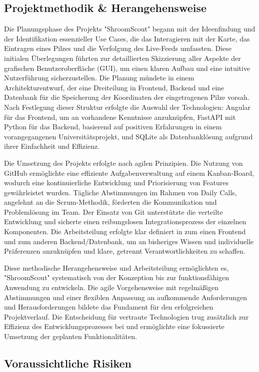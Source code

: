 \documentclass[../main.tex]{subfiles}
\begin{document}
\subsection{Projektmethodik \& Herangehensweise}
Die Planungsphase des Projekts "ShroomScout" begann mit der Ideenfindung und der Identifikation essenzieller Use Cases, 
die das Interagieren mit der Karte, das Eintragen eines Pilzes und die Verfolgung des Live-Feeds umfassten. Diese initialen 
Überlegungen führten zur detaillierten Skizzierung aller Aspekte der grafischen Benutzeroberfläche (GUI), um einen klaren 
Aufbau und eine intuitive Nutzerführung sicherzustellen. Die Planung mündete in einem Architekturentwurf, der eine Dreiteilung 
in Frontend, Backend und eine Datenbank für die Speicherung der Koordinaten der eingetragenen Pilze vorsah. Nach Festlegung 
dieser Struktur erfolgte die Auswahl der Technologien: Angular für das Frontend, um an vorhandene Kenntnisse anzuknüpfen, 
FastAPI mit Python für das Backend, basierend auf positiven Erfahrungen in einem vorangegangenen Universitätsprojekt, und 
SQLite als Datenbanklösung aufgrund ihrer Einfachheit und Effizienz.

Die Umsetzung des Projekts erfolgte nach agilen Prinzipien. Die Nutzung von GitHub ermöglichte eine effiziente Aufgabenverwaltung 
auf einem Kanban-Board, wodurch eine kontinuierliche Entwicklung und Priorisierung von Features gewährleistet wurden. Tägliche 
Abstimmungen im Rahmen von Daily Calls, angelehnt an die Scrum-Methodik, förderten die Kommunikation und Problemlösung im Team. 
Der Einsatz von Git unterstützte die verteilte Entwicklung und sicherte einen reibungslosen Integrationsprozess der einzelnen 
Komponenten. Die Arbeitsteilung erfolgte klar definiert in zum einen Frontend und zum anderen Backend/Datenbank, um an bisheriges
Wissen und individuelle Präferenzen anzuknüpfen und klare, getrennt Verantwortlichkeiten zu schaffen.

Diese methodische Herangehensweise und Arbeitsteilung ermöglichten es, "ShroomScout" systematisch von der Konzeption bis zur 
funktionsfähigen Anwendung zu entwickeln. Die agile Vorgehensweise mit regelmäßigen Abstimmungen und einer flexiblen Anpassung 
an aufkommende Anforderungen und Herausforderungen bildete das Fundament für den erfolgreichen Projektverlauf. Die Entscheidung 
für vertraute Technologien trug zusätzlich zur Effizienz des Entwicklungsprozesses bei und ermöglichte eine fokussierte Umsetzung 
der geplanten Funktionalitäten.

\subsection{Voraussichtliche Risiken}
\end{document}
